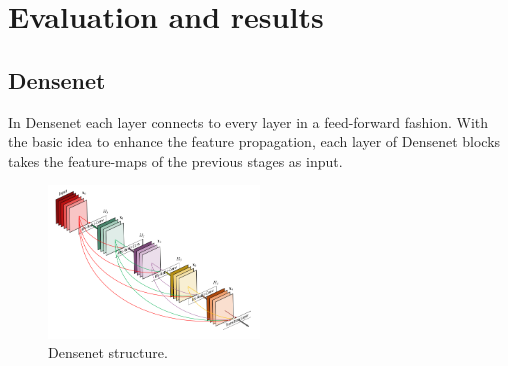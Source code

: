 
\chapter{Evaluation and results}
\section{Densenet}


In Densenet each layer connects to every layer in a feed-forward fashion. 
With the basic idea to enhance the feature propagation, each layer of Densenet blocks takes the feature-maps of the previous stages as input.  

\begin{figure}[h]
\centering
\includegraphics[width=0.5\textwidth]{images/densenet/densenet.png}
\caption{\label{fig:densenet}Densenet structure.}
\end{figure}
\flushbottom
\newpage

